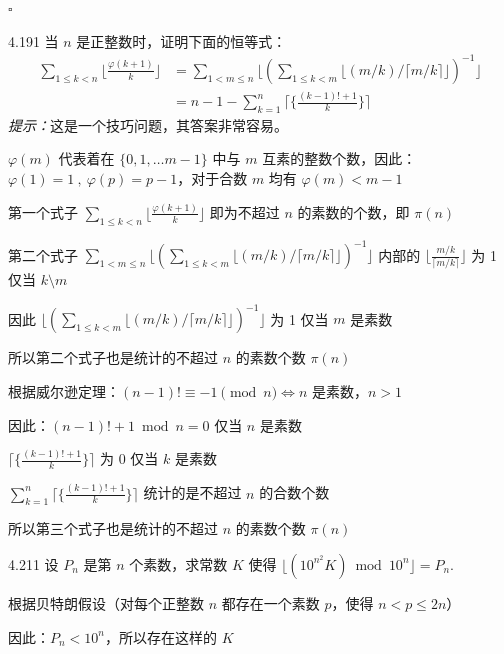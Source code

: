 \hfill \( \square \)

\begin{problem}{4.19}{1}
  当 \( n \) 是正整数时，证明下面的恒等式：
  \begin{align*}
    \sum_{1 \le k < n} \lfloor \frac{\varphi (k+1)}{k} \rfloor & = \sum_{1 < m \le n} \lfloor (\sum_{1 \le k < m} \lfloor (m / k) / \lceil m / k \rceil \rfloor)^{-1} \rfloor \\
    & = n - 1 - \sum_{k=1}^n \lceil \{ \frac{(k-1)! + 1}{k} \} \rceil
  \end{align*}
  \textit{提示：}这是一个技巧问题，其答案非常容易。
\end{problem}

\( \varphi(m) \) 代表着在 \( \{ 0, 1, \dots m-1 \} \) 中与 \( m \) 互素的整数个数，因此：\( \varphi(1) = 1 \ , \ \varphi(p) = p-1 \)，对于合数 \( m \) 均有 \( \varphi(m) < m-1 \)

第一个式子 \( \sum_{1 \le k < n} \lfloor \frac{\varphi (k+1)}{k} \rfloor \) 即为不超过 \( n \) 的素数的个数，即 \( \pi(n) \)

第二个式子 \( \sum_{1 < m \le n} \lfloor (\sum_{1 \le k < m} \lfloor (m / k) / \lceil m / k \rceil \rfloor)^{-1} \rfloor \) 内部的 \( \lfloor \frac{m/k}{\lceil m/k \rceil} \rfloor \) 为 1 仅当 \( k \setminus m \)

因此 \( \lfloor (\sum_{1 \le k < m} \lfloor (m / k) / \lceil m / k \rceil \rfloor)^{-1} \rfloor \) 为 1 仅当 \( m \) 是素数

所以第二个式子也是统计的不超过 \( n \) 的素数个数 \( \pi(n) \)

根据威尔逊定理：\( (n-1)! \equiv -1 \pmod{n} \Leftrightarrow n \) 是素数，\( n>1 \)

因此：\( (n-1)! + 1 \bmod n = 0 \) 仅当 \( n \) 是素数

\( \lceil \{ \frac{(k-1)! + 1}{k} \} \rceil \) 为 0 仅当 \( k \) 是素数

\( \sum_{k=1}^n \lceil \{ \frac{(k-1)! + 1}{k} \} \rceil \) 统计的是不超过 \( n \) 的合数个数

所以第三个式子也是统计的不超过 \( n \) 的素数个数 \( \pi(n) \)

\begin{problem}{4.21}{1}
  设 \( P_n \) 是第 \( n \) 个素数，求常数 \( K \) 使得 \( \lfloor (10^{n^2} K) \bmod 10^n \rfloor = P_n \).
\end{problem}

根据贝特朗假设（对每个正整数 \( n \) 都存在一个素数 \( p \)，使得 \( n < p \le 2n \)）

因此：\( P_n < 10^n \)，所以存在这样的 \( K \)

